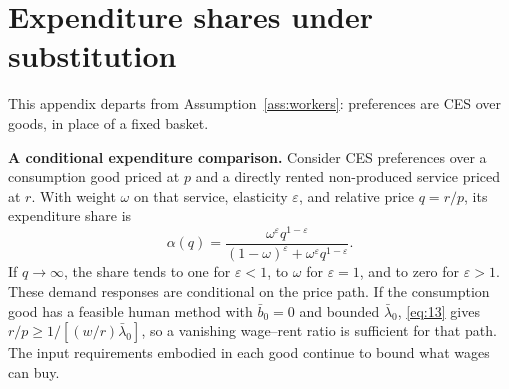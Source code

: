 \documentclass[12pt]{article}
\theoremstyle{plain}
\theoremstyle{definition}
\theoremstyle{remark}
\begin{document}
\section{Expenditure shares under substitution}\label{app:C}

This appendix departs from Assumption~\ref{ass:workers}: preferences are CES over goods, in place of a fixed basket.

\textbf{A conditional expenditure comparison.} Consider CES preferences over a consumption good priced at $p$ and a directly rented non-produced service priced at $r$. With weight $\omega$ on that service, elasticity $\varepsilon$, and relative price $q=r/p$, its expenditure share is
\begin{equation}\label{eq:26}
\alpha(q)=\frac{\omega^\varepsilon q^{1-\varepsilon}}{(1-\omega)^\varepsilon+\omega^\varepsilon q^{1-\varepsilon}}.
\end{equation}
If $q\to\infty$, the share tends to one for $\varepsilon<1$, to $\omega$ for $\varepsilon=1$, and to zero for $\varepsilon>1$. These demand responses are conditional on the price path. If the consumption good has a feasible human method with $\bar{b}_0=0$ and bounded $\bar\lambda_0$, \eqref{eq:13} gives $r/p\ge1/[(w/r)\bar\lambda_0]$, so a vanishing wage--rent ratio is sufficient for that path. The input requirements embodied in each good continue to bound what wages can buy.
\end{document}
